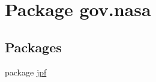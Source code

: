 \hypertarget{namespacegov_1_1nasa}{}\section{Package gov.\+nasa}
\label{namespacegov_1_1nasa}
\subsection*{Packages}
\begin{DoxyCompactItemize}
\item 
package \hyperlink{namespacegov_1_1nasa_1_1jpf}{jpf}
\end{DoxyCompactItemize}
